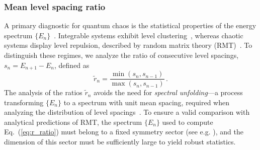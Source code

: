 \documentclass[letterpaper,superscriptaddress,aps,pra,nolongbibliography,showpacs,floatfix,dvipsnames,10pt,twocolumn]{revtex4-2}
\begin{document}
\subsubsection{Mean level spacing ratio}\label{sec:mean_spacing_ratio}
A primary diagnostic for quantum chaos is the statistical properties
of the energy spectrum $\{E_n\}$~\cite{bohigas_1984_characterization, haake_2001_quantum}.
Integrable systems exhibit level clustering~\cite{berry_1977_level},
whereas chaotic systems display level repulsion, described by random
matrix theory (RMT)~\cite{bohigas_1984_characterization,mehta_2004_random}.
To distinguish these regimes, we analyze the ratio of consecutive
level spacings, $s_n = E_{n+1} - E_n$, defined as
\begin{equation}\label{eq:r_ratio}
\tilde r_n = \frac{\min(s_n, s_{n-1})}{\max(s_n, s_{n-1})} \, .
\end{equation}
The analysis of the ratios $\tilde r_n$ avoids the need for \textit{spectral
unfolding}---a process transforming $\{E_n\}$ to a spectrum with unit
mean spacing,
required when analyzing the distribution of level
spacings~\cite{oganesyan_2007_localization}.
To ensure a valid comparison with analytical predictions of RMT, the
spectrum $\{E_n\}$ used to compute Eq.~(\ref{eq:r_ratio}) must
belong to a fixed symmetry sector (see e.g. \cite{haake_2001_quantum}), 
and the dimension of this sector 
must be sufficiently large to yield robust statistics. 
\end{document}
